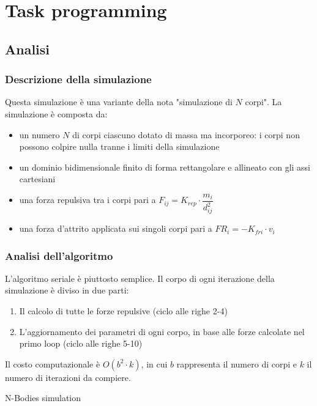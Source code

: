 \documentclass[report]{subfiles}
\begin{document}
	\section{Task programming}
	\subsection{Analisi}
	\subsubsection{Descrizione della simulazione}
	Questa simulazione è una variante della nota "simulazione di $N$ corpi". La simulazione è composta da:
	\begin{itemize}
		\item un numero $N$ di corpi ciascuno dotato di massa ma incorporeo: i corpi non possono colpire nulla tranne i limiti della simulazione
		\item un dominio bidimensionale finito di forma rettangolare e allineato con gli assi cartesiani
		\item una forza repulsiva tra i corpi pari a $F_{ij}=K_{rep}\cdot\dfrac{m_i}{d_{ij}^2}$
		\item una forza d'attrito applicata sui singoli corpi pari a $FR_i=-K_{fri}\cdot{v_i}$
	\end{itemize}
	
	\subsubsection{Analisi dell'algoritmo}
	L'algoritmo seriale è piuttosto semplice. Il corpo di ogni iterazione della simulazione è diviso in due parti:
	\begin{enumerate}
		\item Il calcolo di tutte le forze repulsive (ciclo alle righe 2-4)
		\item L'aggiornamento dei parametri di ogni corpo, in base alle forze calcolate nel primo loop (ciclo alle righe 5-10)
	\end{enumerate}
	Il costo computazionale è $O(b^2\cdot k)$, in cui $b$ rappresenta il numero di corpi e $k$ il numero di iterazioni da compiere.
	\begin{algorithm}
		
		\caption{N-Bodies simulation}
	\end{algorithm}
	
\end{document}
